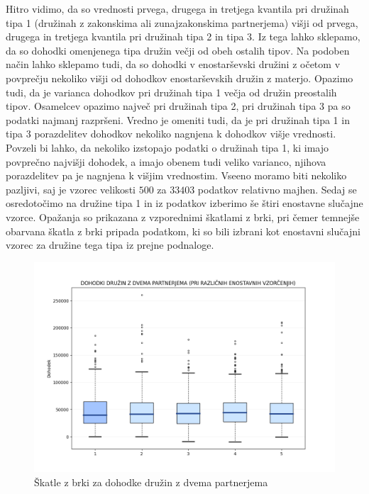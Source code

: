 \documentclass{article}
\begin{document}
Hitro vidimo, da so vrednosti prvega, drugega in tretjega kvantila pri družinah tipa 1 (družinah z zakonskima ali zunajzakonskima partnerjema) višji od prvega, drugega in tretjega kvantila pri družinah tipa 2 in tipa 3. 
Iz tega lahko sklepamo, da so dohodki omenjenega tipa družin večji od obeh ostalih tipov. Na podoben način lahko sklepamo tudi, da so dohodki v enostarševski družini z očetom v povprečju nekoliko višji od dohodkov enostarševskih družin z materjo. 
Opazimo tudi, da je varianca dohodkov pri družinah tipa 1 večja od družin preostalih tipov. 
Osamelcev opazimo največ pri družinah tipa 2, pri družinah tipa 3 pa so podatki najmanj razpršeni. 
Vredno je omeniti tudi, da je pri družinah tipa 1 in tipa 3 porazdelitev dohodkov nekoliko nagnjena k dohodkov višje vrednosti.
\newline
Povzeli bi lahko, da nekoliko izstopajo podatki o družinah tipa 1, ki imajo povprečno najvišji dohodek, a imajo obenem tudi veliko varianco, njihova porazdelitev pa je nagnjena k višjim vrednostim.
Vseeno moramo biti nekoliko pazljivi, saj je vzorec velikosti $500$ za $33403$ podatkov relativno majhen.
\newline
\newline
Sedaj se osredotočimo na družine tipa 1 in iz podatkov izberimo še štiri enostavne slučajne vzorce. 
Opažanja so prikazana z vzporednimi škatlami z brki, pri čemer temnejše obarvana škatla z brki pripada podatkom, ki so bili izbrani kot enostavni slučajni vzorec za družine tega tipa iz prejne podnaloge.

\begin{figure}[H]
    \begin{center}
    \includegraphics[width=\linewidth]{naloga1b.png}
    \vspace*{-10mm}\caption{Škatle z brki za dohodke družin z dvema partnerjema}
    \end{center}    
\end{figure}
\end{document}
